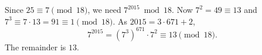 Since $25\equiv7\pmod{18}$, we need $7^{2015}\bmod 18$. Now $7^2=49\equiv13$ and $7^3\equiv 7\cdot13=91\equiv1\pmod{18}$. As $2015=3\cdot671+2$,
\[7^{2015}=\left(7^3\right)^{671}\cdot7^2\equiv 13\pmod{18}.\]
The remainder is $\boxed{13}$.
